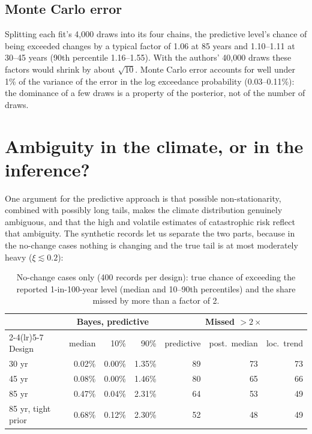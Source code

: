 \documentclass[11pt]{article}
\begin{document}
\subsection{Monte Carlo error}

Splitting each fit's 4,000 draws into its four chains, the predictive level's chance of being
exceeded changes by a typical factor of 1.06 at 85 years and 1.10--1.11 at 30--45 years (90th
percentile 1.16--1.55). With the authors' 40,000 draws these factors would shrink by about
$\sqrt{10}$. Monte Carlo error accounts for well under 1\% of the variance of the error in the
log exceedance probability (0.03--0.11\%): the dominance of a few draws is a property of the posterior, not of
the number of draws.

\section{Ambiguity in the climate, or in the inference?}\label{sec:ambiguity}

One argument for the predictive approach is that possible non-stationarity, combined with possibly
long tails, makes the climate distribution genuinely ambiguous, and that the high and volatile
estimates of catastrophic risk reflect that ambiguity. The synthetic records let us separate the
two parts, because in the no-change cases nothing is changing and the true tail is at most moderately heavy
($\xi\lesssim0.2$):

\begin{table}[H]
\centering\small
\caption{No-change cases only (400 records per design): true chance of exceeding the reported
1-in-100-year level (median and 10--90th percentiles) and the share missed by more than a factor of
2.}\label{tab:null}
\begin{tabular}{l rrr rrr}
\toprule
 & \multicolumn{3}{c}{Bayes, predictive} & \multicolumn{3}{c}{Missed $>2\times$} \\
\cmidrule(lr){2-4}\cmidrule(lr){5-7}
Design & median & 10\% & 90\% & predictive & post.\ median & loc.\ trend \\
\midrule
30 yr & 0.02\% & 0.00\% & 1.35\% & 89 & 73 & 73 \\
45 yr & 0.08\% & 0.00\% & 1.46\% & 80 & 65 & 66 \\
85 yr & 0.47\% & 0.04\% & 2.31\% & 64 & 53 & 49 \\
85 yr, tight prior & 0.68\% & 0.12\% & 2.30\% & 52 & 48 & 49 \\
\bottomrule
\end{tabular}
\end{table}
\end{document}
